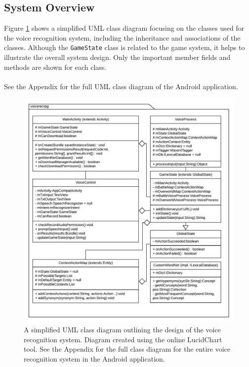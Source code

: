 \documentclass[12pt]{article}
\begin{document}
\subsection{System Overview}

Figure \ref{fig:system-overview} shows a simplified UML class diagram focusing on the classes used for the voice recognition system, including the inheritance and associations of the classes. Although the \texttt{GameState} class is related to the game system, it helps to illustrate the overall system design. Only the important member fields and methods are shown for each class.
\\
\\
See the Appendix for the full UML class diagram of the Android application. 

\begin{center}
\begin{figure}[H]
\begin{center}
  \includegraphics[width=\linewidth]{system-overview.pdf}
  \caption{A simplified UML class diagram outlining the design of the voice recognition system. Diagram created using the online LucidChart tool. See the Appendix for the full class diagram for the entire voice recognition system in the Android application.}
  \label{fig:system-overview}
  \end{center}
\end{figure}
\end{center}
\end{document}

